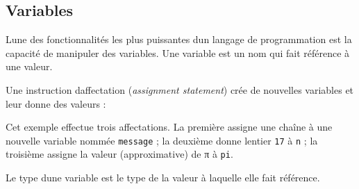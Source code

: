 \hypertarget{variables}{%
\subsection{Variables}\label{variables}}

L\textquotesingle une des fonctionnalités les plus puissantes
d\textquotesingle un langage de programmation est la capacité de
manipuler des variables. Une variable est un nom qui fait référence à
une valeur.

Une instruction d\textquotesingle affectation (\emph{assignment
statement}) crée de nouvelles variables et leur donne des valeurs :

\begin{Shaded}
\begin{Highlighting}[]
\OperatorTok{\textgreater{}\textgreater{}\textgreater{}}\OperatorTok{=} 
\OperatorTok{\textgreater{}\textgreater{}\textgreater{}}\OperatorTok{=} 
\OperatorTok{\textgreater{}\textgreater{}\textgreater{}}\OperatorTok{=} 
\end{Highlighting}
\end{Shaded}

Cet exemple effectue trois affectations. La première assigne une chaîne
à une nouvelle variable nommée \texttt{message} ; la deuxième donne
l\textquotesingle entier \texttt{17} à \texttt{n} ; la troisième assigne
la valeur (approximative) de π à \texttt{pi}.

Le type d\textquotesingle une variable est le type de la valeur à
laquelle elle fait référence.

\begin{Shaded}
\begin{Highlighting}[]
\OperatorTok{\textgreater{}\textgreater{}\textgreater{}} 
\OperatorTok{\textless{}} \OperatorTok{\textgreater{}}
\OperatorTok{\textgreater{}\textgreater{}\textgreater{}} 
\OperatorTok{\textless{}} \OperatorTok{\textgreater{}}
\OperatorTok{\textgreater{}\textgreater{}\textgreater{}} 
\OperatorTok{\textless{}} \OperatorTok{\textgreater{}}
\end{Highlighting}
\end{Shaded}

